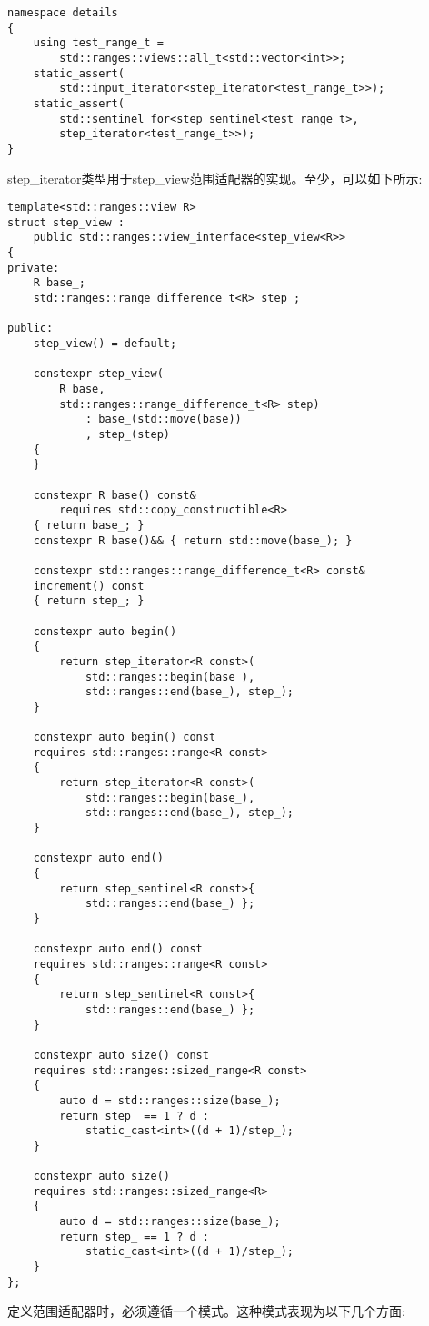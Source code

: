\begin{lstlisting}[style=styleCXX]
namespace details
{
	using test_range_t =
		std::ranges::views::all_t<std::vector<int>>;
	static_assert(
		std::input_iterator<step_iterator<test_range_t>>);
	static_assert(
		std::sentinel_for<step_sentinel<test_range_t>,
		step_iterator<test_range_t>>);
}
\end{lstlisting}

step\_iterator类型用于step\_view范围适配器的实现。至少，可以如下所示:

\begin{lstlisting}[style=styleCXX]
template<std::ranges::view R>
struct step_view :
	public std::ranges::view_interface<step_view<R>>
{
private:
	R base_;
	std::ranges::range_difference_t<R> step_;
	
public:
	step_view() = default;
	
	constexpr step_view(
		R base,
		std::ranges::range_difference_t<R> step)
			: base_(std::move(base))
			, step_(step)
	{
	}

	constexpr R base() const&
		requires std::copy_constructible<R>
	{ return base_; }
	constexpr R base()&& { return std::move(base_); }
	
	constexpr std::ranges::range_difference_t<R> const&
	increment() const
	{ return step_; }
	
	constexpr auto begin()
	{
		return step_iterator<R const>(
			std::ranges::begin(base_),
			std::ranges::end(base_), step_);
	}

	constexpr auto begin() const
	requires std::ranges::range<R const>
	{
		return step_iterator<R const>(
			std::ranges::begin(base_),
			std::ranges::end(base_), step_);
	}

	constexpr auto end()
	{
		return step_sentinel<R const>{
			std::ranges::end(base_) };
	}

	constexpr auto end() const
	requires std::ranges::range<R const>
	{
		return step_sentinel<R const>{
			std::ranges::end(base_) };
	}

	constexpr auto size() const
	requires std::ranges::sized_range<R const>
	{
		auto d = std::ranges::size(base_);
		return step_ == 1 ? d :
			static_cast<int>((d + 1)/step_); 
	}
	
	constexpr auto size()
	requires std::ranges::sized_range<R>
	{
		auto d = std::ranges::size(base_);
		return step_ == 1 ? d :
			static_cast<int>((d + 1)/step_);
	}
};
\end{lstlisting}

定义范围适配器时，必须遵循一个模式。这种模式表现为以下几个方面:

